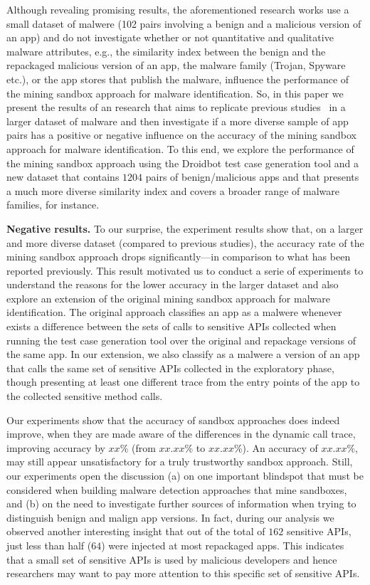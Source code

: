Although revealing promising results, the aforementioned research works use a small dataset of malwere
(102 pairs involving a benign and a malicious version of an app)
and do not investigate whether or not quantitative and qualitative malware attributes, e.g., the similarity index between the benign and the repackaged malicious version of an app,
the malware family (Trojan, Spyware etc.), or the app stores that publish the malware, influence the performance of the mining sandbox approach for malware identification.
So, in this paper we present the results of an research that aims to replicate previous studies~\cite{}
in a larger dataset of malware and
then investigate if a more diverse sample of app pairs has a positive or negative influence on the accuracy of the mining sandbox approach for
malware identification. To this end, we explore the performance of the mining sandbox approach using the Droidbot
test case generation tool and a new dataset
that contains $1204$ pairs of benign/malicious apps and that presents a much more diverse similarity index and covers a broader range of malware families, for instance.


{\bf Negative results.} To our surprise, the experiment results show that, on a larger and more diverse dataset (compared to previous studies), the accuracy rate of the mining sandbox approach drops significantly---in comparison to what has been reported previously. This result motivated us to conduct a serie of experiments to understand the reasons for the lower accuracy in the larger dataset and also explore an extension of the original mining sandbox approach for malware identification. The original approach classifies an app as a malwere whenever exists a difference between the sets of calls to sensitive APIs collected when running the test case generation tool over the original and repackage versions of the same app. In our extension, we also classify as a malwere a version of an app that calls the same set of sensitive APIs collected in the exploratory phase, though presenting at least one different trace from the entry points of the app to the collected sensitive method calls. 

Our experiments show that the accuracy of sandbox approaches does indeed improve, when they are made aware of the differences in the dynamic call trace, improving accuracy by $xx\%$ (from $xx.xx\%$ to $xx.xx\%$). 
An accuracy of $xx.xx\%$, may still appear unsatisfactory for a truly trustworthy sandbox approach. Still, 
our experiments open the discussion (a) on one important blindspot that must be considered when building 
malware detection approaches that mine sandboxes, and (b) on the need to investigate further sources of information when trying to distinguish benign and malign app versions. 
In fact, during our analysis we observed another interesting insight that out of the total of $162$ sensitive APIs, just less than half ($64$) were injected at most repackaged apps. 
This indicates that a small set of sensitive APIs is used by malicious developers and hence 
researchers may want to pay more attention to this specific set of sensitive APIs.\\

